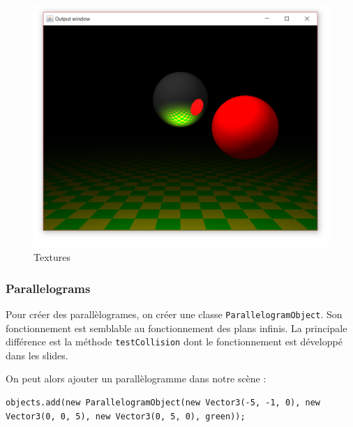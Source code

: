 \begin{figure}[H]
	\caption{\label{10_4} Textures}
	\centering
	\includegraphics[scale = 0.4]{Figures/10_4.png}
\end{figure}

\subsubsection{Parallelograms}

Pour créer des parallèlogrames, on créer une classe \texttt{ParallelogramObject}. Son fonctionnement est semblable au fonctionnement des plans infinis. La principale différence est la méthode \texttt{testCollision} dont le fonctionnement est développé dans les slides.


On peut alors ajouter un parallèlogramme dans notre scène :

\begin{lstlisting}
objects.add(new ParallelogramObject(new Vector3(-5, -1, 0), new Vector3(0, 0, 5), new Vector3(0, 5, 0), green));
\end{lstlisting}


